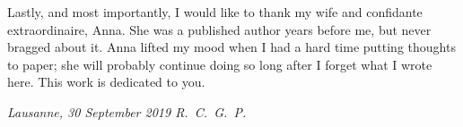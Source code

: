 \vspace*{\fill}

Lastly, and most importantly, I would like to thank my wife and confidante extraordinaire, Anna. She was a published author years before me, but never bragged about it. Anna lifted my mood when I had a hard time putting thoughts to paper; she will probably continue doing so long after I forget what I wrote here. This work is dedicated to you.

\vspace*{\fill}

\emph{Lausanne, 30 September 2019 \hfill R.~C.~G.~P.}
